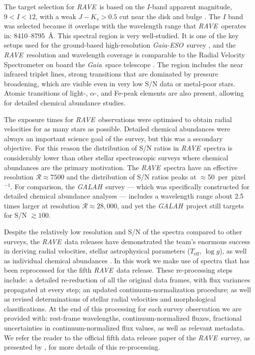 \documentclass[preprint,trackchanges]{aastex}
\newcommand{\acronym}[1]{{\small{#1}}}
\newcommand{\project}[1]{\textsl{#1}}
\newcommand{\gaia}{\project{Gaia}}
\newcommand{\rave}{\project{\acronym{RAVE}}}
\newcommand{\galah}{\project{\acronym{GALAH}}}
\newcommand{\ges}{\project{Gaia-ESO}}
\newcommand{\teff}{T_{\mathrm{eff}}}
\newcommand{\logg}{\log g}
\begin{document}
The target selection for \rave\ is based on the $I$-band apparent magnitude,
$9 < I < 12$, with a weak $J - K_s > 0.5$ cut near the disk and bulge \citep{Wonjo_2016}.  
The $I$ band was selected because it overlaps with the wavelength range that \rave\ 
operates in:  8410--8795~\AA.  This spectral region is very well-studied.  It is one 
of the key setups used for the ground-based high-resolution \ges\ survey
\citep{Gilmore_2012,Randich_2013}, and the \rave\ resolution and wavelength
coverage is comparable to the Radial Velocity Spectrometer on board the \gaia\
space telescope \citep{Recio-Blanco_2016}.  The region includes the  
near infrared triplet lines, strong transitions that are dominated by pressure 
broadening, which are visible even in very low S/N data or metal-poor stars.  
Atomic transitions of light-, $\alpha$-, and Fe-peak elements are also present, 
allowing for detailed chemical abundance studies.


The exposure times for \rave\ observations were optimised to obtain radial 
velocities for as many stars as possible.  Detailed chemical abundances were
always an important science goal of the survey, but this was a secondary objective.  
For this reason the distribution of S/N ratios in \rave\ spectra is considerably 
lower than other stellar spectroscopic surveys where chemical abundances are the 
primary motivation.  The \rave\ spectra have an effective resolution 
$\mathcal{R} \approx 7500$ and the distribution of S/N ratios peaks at 
$\approx$50~per~pixel$^{-1}$.  For comparison, the \galah\ survey 
\citep{DeSilva_2015} --- which was specifically constructed for detailed chemical 
abundance analyses --- includes a wavelength range about 2.5 times larger at 
resolution $\mathcal{R} \approx 28,000$, and yet the \galah\ project still 
targets for S/N $\gtrsim100$.


Despite the relatively low resolution and S/N of the spectra compared to other
surveys, the \rave\ data releases have demonstrated the team's enormous success 
in deriving radial velocities, stellar astrophysical parameters ($\teff$, $\logg$),
as well as individual chemical abundances \citep{Steinmetz_2006,Zwitter_2008,
Siebert_2011,Kordopatis_2013,Kunder_2016}.  In this work we make use of spectra
that has been reprocessed for the fifth \rave\ data release.  These re-processing
steps include: a detailed re-reduction of all the original data frames, with flux
variances propagated at every step; an updated continuum-normalization procedure;
as well as revised determinations of stellar radial velocities and morphological
classifications. At the end of this processing for each survey observation we are 
provided with: rest-frame wavelengths, continuum-normalized fluxes, fractional 
uncertainties in continuum-normalized flux values, as well as relevant metadata.  
We refer the reader to the official fifth data release paper of the \rave\ survey, 
as presented by \citet{Kunder_2016}, for more details of this re-processing.
\end{document}
